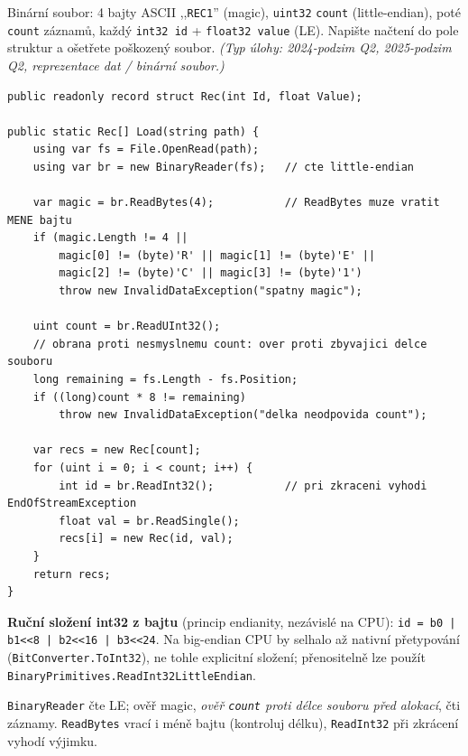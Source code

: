\begin{zadani}
Binární soubor: 4 bajty ASCII ,,\texttt{REC1}'' (magic), \texttt{uint32} \texttt{count} (little-endian), poté \texttt{count} záznamů, každý \texttt{int32 id} + \texttt{float32 value} (LE). Napište načtení do pole struktur a ošetřete poškozený soubor. \emph{(Typ úlohy: 2024-podzim Q2, 2025-podzim Q2, reprezentace dat / binární soubor.)}
\end{zadani}

\begin{reseni}
\begin{lstlisting}
public readonly record struct Rec(int Id, float Value);

public static Rec[] Load(string path) {
    using var fs = File.OpenRead(path);
    using var br = new BinaryReader(fs);   // cte little-endian

    var magic = br.ReadBytes(4);           // ReadBytes muze vratit MENE bajtu
    if (magic.Length != 4 ||
        magic[0] != (byte)'R' || magic[1] != (byte)'E' ||
        magic[2] != (byte)'C' || magic[3] != (byte)'1')
        throw new InvalidDataException("spatny magic");

    uint count = br.ReadUInt32();
    // obrana proti nesmyslnemu count: over proti zbyvajici delce souboru
    long remaining = fs.Length - fs.Position;
    if ((long)count * 8 != remaining)
        throw new InvalidDataException("delka neodpovida count");

    var recs = new Rec[count];
    for (uint i = 0; i < count; i++) {
        int id = br.ReadInt32();           // pri zkraceni vyhodi EndOfStreamException
        float val = br.ReadSingle();
        recs[i] = new Rec(id, val);
    }
    return recs;
}
\end{lstlisting}
\textbf{Ruční složení int32 z bajtu} (princip endianity, nezávislé na CPU): \texttt{id = b0 | b1<<8 | b2<<16 | b3<<24}. Na big-endian CPU by selhalo až nativní přetypování (\texttt{BitConverter.ToInt32}), ne tohle explicitní složení; přenositelně lze použít \texttt{BinaryPrimitives.ReadInt32LittleEndian}.
\end{reseni}

\begin{jadro}
\texttt{BinaryReader} čte LE; ověř magic, \emph{ověř \texttt{count} proti délce souboru před alokací}, čti záznamy. \texttt{ReadBytes} vrací i méně bajtu (kontroluj délku), \texttt{ReadInt32} při zkrácení vyhodí výjimku.
\end{jadro}

